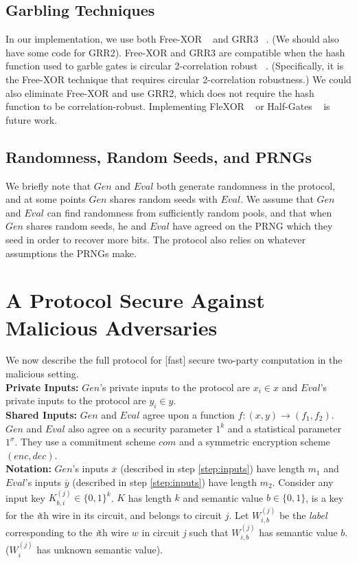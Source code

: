 \documentclass{article}
\begin{document}
\subsection{Garbling Techniques}
In our implementation, we use both Free-XOR ~\cite{freeXOR} and GRR3 ~\cite{GRR}. (We should also have some code for GRR2). Free-XOR and GRR3 are compatible when the hash function used to garble gates is circular 2-correlation robust ~\cite{GRR, freeXOR-security}. (Specifically, it is the Free-XOR technique that requires circular 2-correlation robustness.) We could also eliminate Free-XOR and use GRR2, which does not require the hash function to be correlation-robust. Implementing FleXOR ~\cite{flexor} or Half-Gates ~\cite{half-gates} is future work.

\subsection{Randomness, Random Seeds, and PRNGs}
We briefly note that $Gen$ and $Eval$ both generate randomness in the protocol, and at some points $Gen$ shares random seeds with $Eval$. We assume that $Gen$ and $Eval$ can find randomness from sufficiently random pools, and that when $Gen$ shares random seeds, he and $Eval$ have agreed on the PRNG which they seed in order to recover more bits. The protocol also relies on whatever assumptions the PRNGs make.

\section{A Protocol Secure Against Malicious Adversaries}\label{sec:protocol}

We now describe the full protocol for [fast] secure two-party computation in the malicious setting.\\

\textbf{Private Inputs: }
$Gen$'s private inputs to the protocol are $x_{i} \in x$ and $Eval$'s private inputs to the protocol are $y_{i} \in y$.\\
\textbf{Shared Inputs: }
$Gen$ and $Eval$ agree upon a function $f : (x,y) \rightarrow (f_{1},f_{2})$.  $Gen$ and $Eval$ also agree on a security parameter $1^{k}$ and a statistical parameter $1^{\sigma}$. They use a commitment scheme $com$ and a symmetric encryption scheme $(enc,dec)$. \\
\textbf{Notation: }
$Gen$'s inputs $\overline{x}$ (described in step \ref{step:inputs}) have length $m_1$ and $Eval$'s inputs $\overline{y}$ (described in step \ref{step:inputs}) have length $m_2$.  Consider any input key $K_{b,i}^{(j)} \in \{0,1\}^{k}$. $K$ has length $k$ and semantic value $b \in \{0,1\}$, is a key for the \emph{i}th wire in its circuit, and belongs to circuit $j$. Let $W_{i,b}^{(j)}$ be the \emph{label} corresponding to the \emph{i}th wire $w$ in circuit \emph{j} such that $W_{i,b}^{(j)}$ has semantic value $b$. ($W_{i}^{(j)}$ has unknown semantic value).
\end{document}
